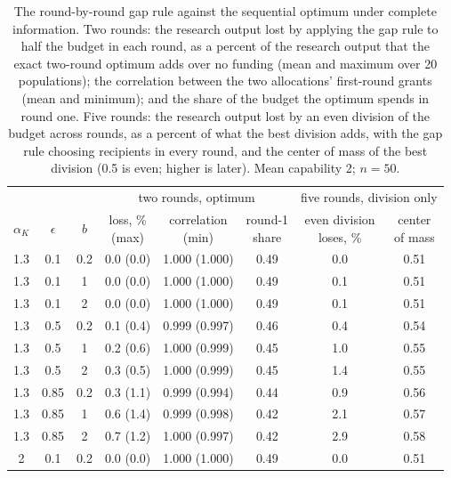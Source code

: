 \begin{table}[tp]
\centering
\footnotesize
\setlength{\tabcolsep}{3pt}
\caption{The round-by-round gap rule against the sequential optimum under complete information. Two rounds: the research output lost by applying the gap rule to half the budget in each round, as a percent of the research output that the exact two-round optimum adds over no funding (mean and maximum over 20 populations); the correlation between the two allocations' first-round grants (mean and minimum); and the share of the budget the optimum spends in round one. Five rounds: the research output lost by an even division of the budget across rounds, as a percent of what the best division adds, with the gap rule choosing recipients in every round, and the center of mass of the best division (0.5 is even; higher is later). Mean capability 2; $n = 50$.}
\label{tab:dynopt}
\begin{tabular}{@{}cccccccc@{}}
\toprule
& & & \multicolumn{3}{c}{two rounds, optimum} & \multicolumn{2}{c}{five rounds, division only} \\
$\alpha_K$ & $\epsilon$ & $b$ & \makecell{loss, \%\\(max)} & \makecell{correlation\\(min)} & \makecell{round-1\\share} & \makecell{even division\\loses, \%} & \makecell{center\\of mass} \\
\midrule
1.3 & 0.1 & 0.2 & 0.0 (0.0) & 1.000 (1.000) & 0.49 & 0.0 & 0.51 \\
1.3 & 0.1 & 1 & 0.0 (0.0) & 1.000 (1.000) & 0.49 & 0.1 & 0.51 \\
1.3 & 0.1 & 2 & 0.0 (0.0) & 1.000 (1.000) & 0.49 & 0.1 & 0.51 \\
1.3 & 0.5 & 0.2 & 0.1 (0.4) & 0.999 (0.997) & 0.46 & 0.4 & 0.54 \\
1.3 & 0.5 & 1 & 0.2 (0.6) & 1.000 (0.999) & 0.45 & 1.0 & 0.55 \\
1.3 & 0.5 & 2 & 0.3 (0.5) & 1.000 (0.999) & 0.45 & 1.4 & 0.55 \\
1.3 & 0.85 & 0.2 & 0.3 (1.1) & 0.999 (0.994) & 0.44 & 0.9 & 0.56 \\
1.3 & 0.85 & 1 & 0.6 (1.4) & 0.999 (0.998) & 0.42 & 2.1 & 0.57 \\
1.3 & 0.85 & 2 & 0.7 (1.2) & 1.000 (0.997) & 0.42 & 2.9 & 0.58 \\
2 & 0.1 & 0.2 & 0.0 (0.0) & 1.000 (1.000) & 0.49 & 0.0 & 0.51 \\

\end{tabular}
\end{table}
